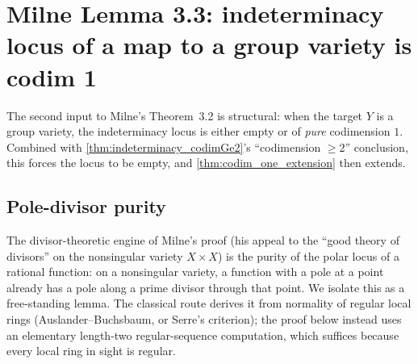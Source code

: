 \section{Milne Lemma 3.3: indeterminacy locus of a map to a group variety is codim 1}
\label{sec:milne_lem33}

The second input to Milne's Theorem~3.2 is structural: when the target \(Y\) is a group
variety, the indeterminacy locus is either empty or of \emph{pure} codimension \(1\).
Combined with \cref{thm:indeterminacy_codimGe2}'s ``codimension \(\geq 2\)'' conclusion,
this forces the locus to be empty, and \cref{thm:codim_one_extension} then extends.

\subsection{Pole-divisor purity}
\label{subsec:pole_divisor_purity}

The divisor-theoretic engine of Milne's proof (his appeal to the ``good theory of
divisors'' on the nonsingular variety \(X \times X\)) is the purity of the polar locus
of a rational function: on a nonsingular variety, a function with a pole at a point
already has a pole along a prime divisor through that point. We isolate this as a
free-standing lemma. The classical route derives it from normality of regular local
rings (Auslander--Buchsbaum, or Serre's criterion); the proof below instead uses an
elementary length-two regular-sequence computation, which suffices because every local
ring in sight is regular.

